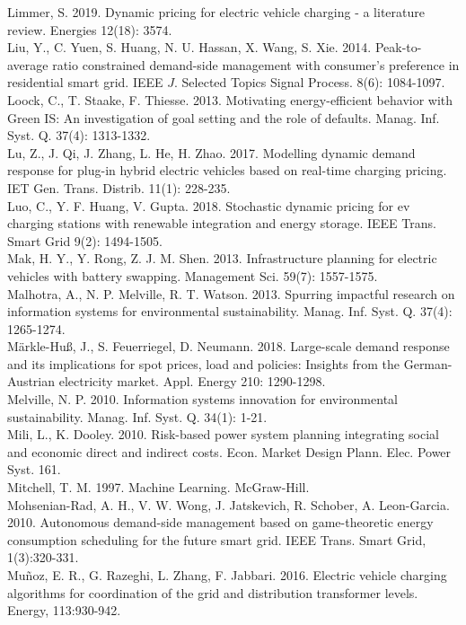 \documentclass[10pt]{article}
\begin{document}
Limmer, S. 2019. Dynamic pricing for electric vehicle charging - a literature review. Energies 12(18): 3574.\\
Liu, Y., C. Yuen, S. Huang, N. U. Hassan, X. Wang, S. Xie. 2014. Peak-to-average ratio constrained demand-side management with consumer's preference in residential smart grid. IEEE $J$. Selected Topics Signal Process. 8(6): 1084-1097.\\
Loock, C., T. Staake, F. Thiesse. 2013. Motivating energy-efficient behavior with Green IS: An investigation of goal setting and the role of defaults. Manag. Inf. Syst. Q. 37(4): 1313-1332.\\
Lu, Z., J. Qi, J. Zhang, L. He, H. Zhao. 2017. Modelling dynamic demand response for plug-in hybrid electric vehicles based on real-time charging pricing. IET Gen. Trans. Distrib. 11(1): 228-235.\\
Luo, C., Y. F. Huang, V. Gupta. 2018. Stochastic dynamic pricing for ev charging stations with renewable integration and energy storage. IEEE Trans. Smart Grid 9(2): 1494-1505.\\
Mak, H. Y., Y. Rong, Z. J. M. Shen. 2013. Infrastructure planning for electric vehicles with battery swapping. Management Sci. 59(7): 1557-1575.\\
Malhotra, A., N. P. Melville, R. T. Watson. 2013. Spurring impactful research on information systems for environmental sustainability. Manag. Inf. Syst. Q. 37(4): 1265-1274.\\
Märkle-Huß, J., S. Feuerriegel, D. Neumann. 2018. Large-scale demand response and its implications for spot prices, load and policies: Insights from the German-Austrian electricity market. Appl. Energy 210: 1290-1298.\\
Melville, N. P. 2010. Information systems innovation for environmental sustainability. Manag. Inf. Syst. Q. 34(1): 1-21.\\
Mili, L., K. Dooley. 2010. Risk-based power system planning integrating social and economic direct and indirect costs. Econ. Market Design Plann. Elec. Power Syst. 161.\\
Mitchell, T. M. 1997. Machine Learning. McGraw-Hill.\\
Mohsenian-Rad, A. H., V. W. Wong, J. Jatskevich, R. Schober, A. Leon-Garcia. 2010. Autonomous demand-side management based on game-theoretic energy consumption scheduling for the future smart grid. IEEE Trans. Smart Grid, 1(3):320-331.\\
Muñoz, E. R., G. Razeghi, L. Zhang, F. Jabbari. 2016. Electric vehicle charging algorithms for coordination of the grid and distribution transformer levels. Energy, 113:930-942.\\
\end{document}
